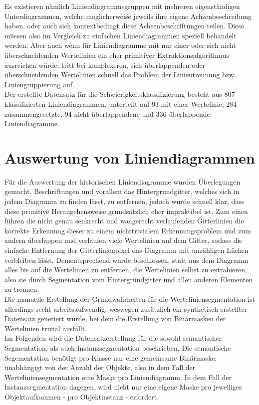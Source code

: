 Es existieren nämlich Liniendiagrammsgruppen mit mehreren eigenständigen Unterdiagrammen, welche möglicherweise jeweils ihre eigene Achsenbeschreibung haben, oder auch sich kontextbedingt diese Achsenbeschriftungen teilen. Diese müssen also im Vergleich zu einfachen Liniendiagrammen speziell behandelt werden. Aber auch wenn für Liniendiagramme mit nur einer oder sich nicht überschneidenden Wertelinien ein eher primitiver Extraktionsalgorithmus ausreichen würde, tritt bei komplexeren, sich überlappenden oder überschneidenden Wertelinien schnell das Problem der Linientrennung bzw. Liniengruppierung auf.
\\
Der erstellte Datensatz für die Schwierigkeitsklassifizierung besteht aus 807 klassifizierten Liniendiagrammen, unterteilt auf 93 mit einer Wertelinie, 284 zusammengesetzte, 94 nicht überlappendene und 336 überlappende Liniendiagramme.

\section{Auswertung von Liniendiagrammen}

Für die Auswertung der historischen Liniendiagramme wurden Überlegungen gemacht, Beschriftungen und vorallem das Hintergrundgitter, welches sich in jedem Diagramm zu finden lässt, zu entfernen, jedoch wurde schnell klar, dass diese primitive Herangehensweise grundsätzlich eher impraktibel ist. Zum einen führen die nicht genau senkrecht und waagerecht verlaufenden Gitterlinien die korrekte Erkennung dieser zu einem nichttrivialem Erkennungsproblem und zum andern überlappen und verlaufen viele Wertelinien auf dem Gitter, sodass die einfache Entfernung der Gitterlinienpixel das Diagramm mit unzähligen Lücken verbleiben lässt. Dementsprechend wurde beschlossen, statt aus dem Diagramm alles bis auf die Wertelinien zu entfernen, die Wertelinien selbst zu extrahieren, also sie durch Segmentation vom Hintergrundgitter und allen anderen Elementen zu trennen.
\\
Die manuelle Erstellung der Grundwahrheiten für die Werteliniensegmentation ist allerdings recht arbeitsaufwendig, weswegen zusätzlich ein synthetisch erstellter Datensatz generiert wurde, bei dem die Erstellung von Binärmasken der Wertelinien trivial ausfällt.
\\
Im Folgenden wird die Datensatzerstellung für die sowohl semantischer Segmentation, als auch Instanzsegmentation beschrieben. Die semantische Segementation benötigt pro Klasse nur eine gemeinsame Binärmaske, unabhängigt von der Anzahl der Objekte, also in dem Fall der Werteliniensegmentation eine Maske pro Liniendiagramm. In dem Fall der Instanzsegmentation dagegen, wird nicht nur eine eigene Maske pro jeweiliges Objektaufkommen - pro Objektinstanz - erfordert.

